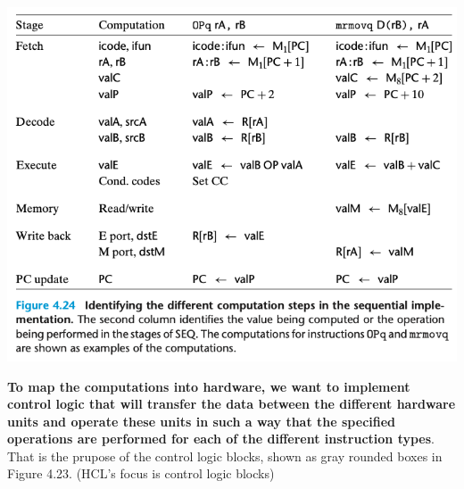 \documentclass[11pt]{article}
\begin{document}
\begin{center}
\includegraphics[width=.9\linewidth]{pics/figure4.24-identifying-the-different-computation-steps-in-the-sequential-implementation.png}
\end{center}

\textbf{To map the computations into hardware, we want to implement control logic that will transfer the data between the different hardware units and operate these units in such a way that the specified operations are performed for each of the different instruction types}. That is the prupose of the control logic blocks, shown as gray rounded boxes in Figure 4.23. (HCL's focus is control logic blocks)\\
\end{document}
